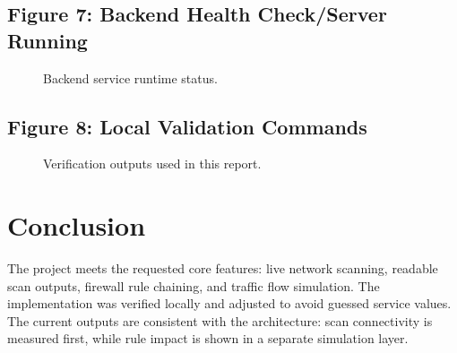\documentclass[12pt,a4paper]{article}
\begin{document}
\subsection*{Figure 7: Backend Health Check/Server Running}
\begin{figure}[H]
\centering
{}
\caption{Backend service runtime status.}
\end{figure}

\subsection*{Figure 8: Local Validation Commands}
\begin{figure}[H]
\centering
{}
\caption{Verification outputs used in this report.}
\end{figure}

\section{Conclusion}
The project meets the requested core features: live network scanning, readable scan outputs, firewall rule chaining, and traffic flow simulation. The implementation was verified locally and adjusted to avoid guessed service values. The current outputs are consistent with the architecture: scan connectivity is measured first, while rule impact is shown in a separate simulation layer.
\end{document}
